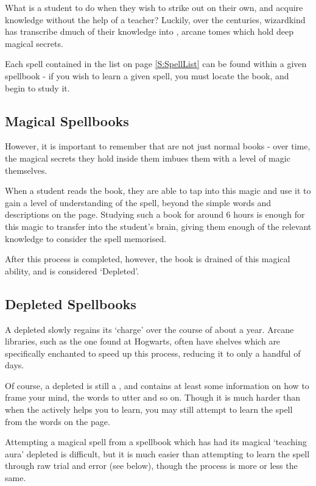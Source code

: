 What is a student to do when they wish to strike out on their own, and acquire knowledge without the help of a teacher? Luckily, over the centuries, wizardkind has transcribe dmuch of their knowledge into , arcane tomes which hold deep magical secrets. 

Each spell contained in the list on page \ref{S:SpellList} can be found within a given spellbook - if you wish to learn a given spell, you must locate the book, and begin to study it.
\subsection{Magical Spellbooks}

However, it is important to remember that  are not just normal books - over time, the magical secrets they hold inside them imbues them with a level of magic themselves. 

When a student reads the book, they are able to tap into this magic and use it to gain a level of understanding of the spell, beyond the simple words and descriptions on the page. Studying such a book for around 6 hours is enough for this magic to transfer into the student's brain, giving them enough of the relevant knowledge to consider the spell memorised. 

After this process is completed, however, the book is drained of this magical ability, and is considered `Depleted'.


\subsection{Depleted Spellbooks}

A depleted  slowly regains its `charge' over the course of about a year. Arcane libraries, such as the one found at Hogwarts, often have shelves which are specifically enchanted to speed up this process, reducing it to only a handful of days. 

Of course, a depleted  is still a , and contains at least some information on how to frame your mind, the words to utter and so on. Though it is much harder than when the  actively helps you to learn, you may still attempt to learn the spell from the words on the page.

Attempting a magical spell from a spellbook which has had its magical `teaching aura' depleted is difficult, but it is much easier than attempting to learn the spell through raw trial and error (see below), though the process is more or less the same. 


